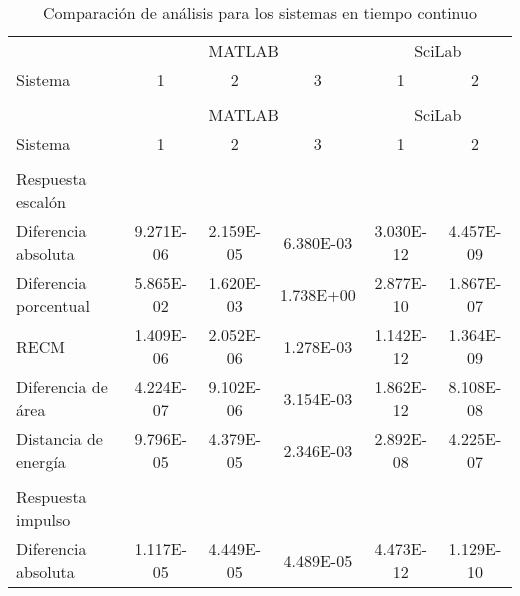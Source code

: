         {\setlength\LTleft{0pt}
        \setlength\LTright{0pt}
        \scriptsize
        \centering
        \renewcommand{\arraystretch}{0.87}
        \begin{longtable}{l @{\extracolsep{\fill}} ccccc}
            \caption[Comparación de análisis - tiempo continuo]{Comparación de análisis para los sistemas en tiempo continuo}
            \label{tab:AnalisisStepC} \\
            \toprule
                    & \multicolumn{3}{c}{MATLAB} & \multicolumn{2}{c}{SciLab}\\ \cmidrule{2-4}\cmidrule{5-6}
            Sistema &    1    &    2    &    3   &     1       &       2     \\ \cmidrule{2-2}\cmidrule{3-3}\cmidrule{4-4}\cmidrule{5-5}\cmidrule{6-6}
            & & & & & \\
            \endfirsthead
            \toprule
                    & \multicolumn{3}{c}{MATLAB} & \multicolumn{2}{c}{SciLab}\\ \cmidrule{2-4}\cmidrule{5-6}
            Sistema &    1    &    2    &    3   &     1       &       2     \\ \cmidrule{2-2}\cmidrule{3-3}\cmidrule{4-4}\cmidrule{5-5}\cmidrule{6-6}
            & & & & & \\
            \endhead
            \bottomrule
            \endfoot
            Respuesta escalón      &  &  &  &  & \\ \cmidrule{1-1}
            Diferencia absoluta    & \num{9.271E-06} & \num{2.159E-05} & \num{6.380E-03} & \num{3.030E-12} & \num{4.457E-09}  \\
            Diferencia porcentual  & \num{5.865E-02} & \num{1.620E-03} & \num{1.738E+00} & \num{2.877E-10} & \num{1.867E-07}  \\
            RECM                   & \num{1.409E-06} & \num{2.052E-06} & \num{1.278E-03} & \num{1.142E-12} & \num{1.364E-09}  \\
            Diferencia de área     & \num{4.224E-07} & \num{9.102E-06} & \num{3.154E-03} & \num{1.862E-12} & \num{8.108E-08}  \\
            Distancia de energía   & \num{9.796E-05} & \num{4.379E-05} & \num{2.346E-03} & \num{2.892E-08} & \num{4.225E-07}  \\
            & & & & & \\
            Respuesta impulso      &  &  &  &  & \\ \cmidrule{1-1}
            Diferencia absoluta    & \num{1.117E-05} & \num{4.449E-05} & \num{4.489E-05} & \num{4.473E-12} & \num{1.129E-10}  \\

\end{longtable}}
